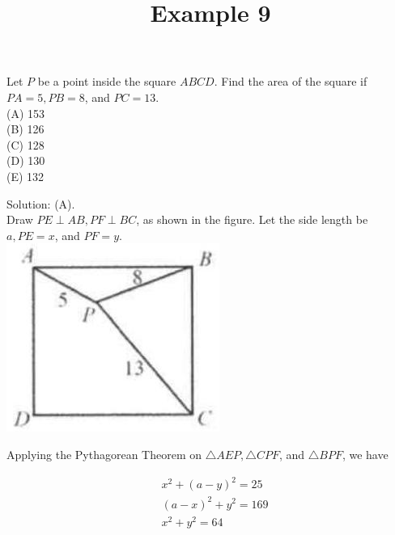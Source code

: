 \documentclass{article}
\title{Example 9}
\date{}
\begin{document}
\maketitle

Let \(P\) be a point inside the square \(A B C D\). Find the area of the square if \(P A=5, P B=8\), and \(P C=13\).\\
(A) 153\\
(B) 126\\
(C) 128\\
(D) 130\\
(E) 132

Solution: (A).\\
Draw \(P E \perp A B, P F \perp B C\), as shown in the figure. Let the side length be \(a, P E=x\), and \(P F=y\).\\
\centering
\includegraphics[width=\textwidth]{images/problem_image_1.jpg}

Applying the Pythagorean Theorem on \(\triangle A E P, \triangle C P F\), and \(\triangle B P F\), we have

\[
\begin{aligned}
& x^{2}+(a-y)^{2}=25 \\
& (a-x)^{2}+y^{2}=169 \\
& x^{2}+y^{2}=64
\end{aligned}
\]
\end{document}
